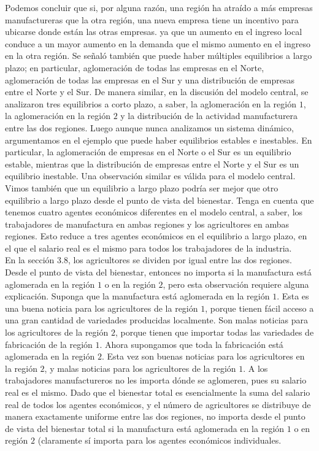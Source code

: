 Podemos concluir que si, por alguna razón, una región ha atraído a más empresas manufactureras que la otra región, una nueva empresa tiene un incentivo para ubicarse donde están las otras empresas. ya que un aumento en el ingreso local conduce a un mayor aumento en la demanda que el mismo aumento en el ingreso en la otra región. Se señaló también  que puede haber múltiples equilibrios a largo plazo; en particular, aglomeración de todas las empresas en el Norte, aglomeración de todas las empresas en el Sur y una distribución  de empresas entre el Norte y el Sur. De manera similar, en la discusión del modelo central, se analizaron tres equilibrios a corto plazo, a saber, la aglomeración en la región $1$, la aglomeración en la región $2$ y la distribución de la actividad manufacturera entre las dos regiones. Luego aunque nunca analizamos un sistema dinámico, argumentamos en el ejemplo  que puede haber equilibrios estables e inestables. En particular, la aglomeración de empresas en el Norte o el Sur es un equilibrio estable, mientras que la distribución de empresas entre el Norte y el Sur es un equilibrio inestable. Una observación similar es válida para el modelo central. Vimos también que un equilibrio a largo plazo podría ser mejor que otro equilibrio a largo plazo desde el punto de vista del bienestar. Tenga en cuenta que tenemos cuatro agentes económicos diferentes en el modelo central, a saber, los trabajadores de manufactura en ambas regiones y los agricultores en ambas regiones. Esto reduce a tres agentes económicos en el equilibrio a largo plazo, en el que el salario real es el mismo para todos los trabajadores de la industria. \\
En la sección 3.8, los agricultores se dividen por igual entre las dos regiones. Desde el punto de vista del bienestar, entonces no importa si la manufactura está aglomerada en la región $1$ o en la región $2$, pero esta observación requiere alguna explicación. Suponga que la manufactura está aglomerada en la región $1$. Esta es una buena noticia para los agricultores de la región $1$,  porque tienen fácil acceso a una gran cantidad de variedades producidas localmente. Son malas noticias para los agricultores de la región $2$, porque tienen que importar todas las variedades de fabricación de la región $1$. Ahora supongamos que toda la fabricación está aglomerada en la región $2$. Esta vez son buenas noticias para los agricultores en la región $2$, y malas noticias para los agricultores de la región $1$. A los trabajadores manufactureros no les importa dónde se aglomeren, pues su salario real es el mismo. Dado que el bienestar total es esencialmente la suma del salario real de todos los agentes económicos, y el número de agricultores se distribuye de manera exactamente uniforme entre las dos regiones, no importa desde el punto de vista del bienestar total si la manufactura está aglomerada en la región $1$ o en región $2$ (claramente sí importa para los agentes económicos individuales.\\
